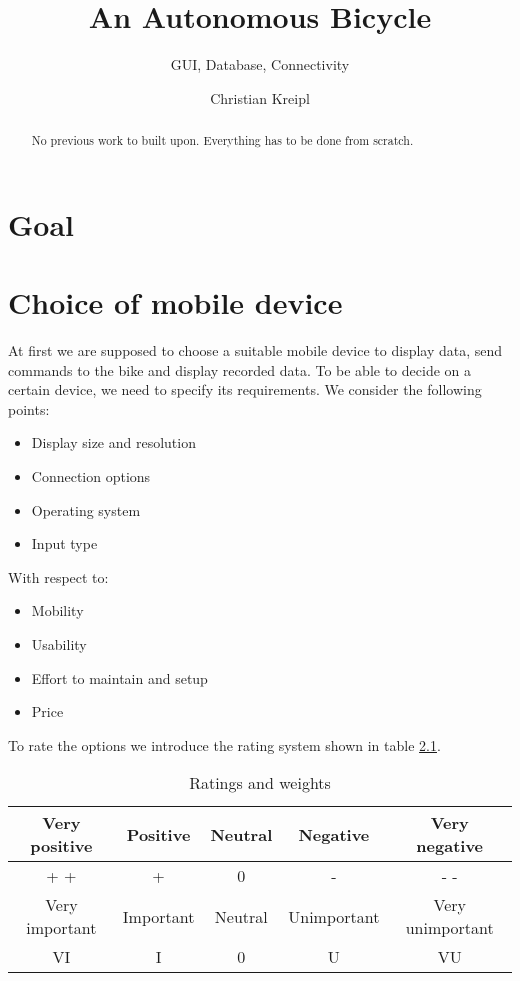 \documentclass[]{scrreprt}
\title{An Autonomous Bicycle}
\subtitle{GUI, Database, Connectivity}
\author{Christian Kreipl}
\begin{document}
\maketitle
\tableofcontents

\begin{abstract}
	No previous work to built upon. Everything has to be done from scratch.
\end{abstract}

\chapter{Goal}
\chapter{Choice of mobile device}
	At first we are supposed to choose a suitable mobile device to display data, send commands to the bike and display recorded data. To be able to decide on a certain device, we need to specify its requirements. We consider the following points:

	\begin{itemize}[noitemsep]
		\item{Display size and resolution}
		\item{Connection options}
		\item{Operating system}
		\item{Input type}
	\end{itemize}

	With respect to:
	\begin{itemize}[noitemsep]
		\item{Mobility}
		\item{Usability}
		\item{Effort to maintain and setup}
		\item{Price}
	\end{itemize}

	To rate the options we introduce the rating system shown in table \ref{tab:RAW}.
	\begin{table}[H]
		\caption {Ratings and weights} \label{tab:RAW}
		\centering
		\begin{tabular}{|c|c|c|c|c|}
			\hline 
			Very positive & Positive & Neutral & Negative & Very negative \\ 
			\hline 
			+ + & + & 0 & - & - - \\ 
			\hline \hline
			Very important & Important & Neutral & Unimportant & Very unimportant \\ 
			\hline 
			VI & I & 0 & U & VU \\ 
			\hline
		\end{tabular}
	\end{table}
\end{document}
